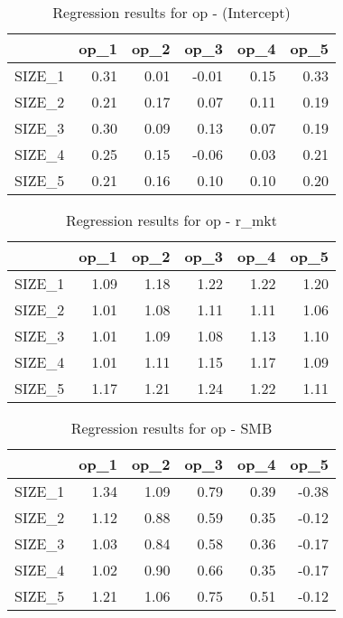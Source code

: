 \begin{table}[ht]
\centering
\caption{Regression results for op - (Intercept)} 
\begin{tabular}{rrrrrr}
  \hline
 & op\_1 & op\_2 & op\_3 & op\_4 & op\_5 \\ 
  \hline
SIZE\_1 & 0.31 & 0.01 & -0.01 & 0.15 & 0.33 \\ 
  SIZE\_2 & 0.21 & 0.17 & 0.07 & 0.11 & 0.19 \\ 
  SIZE\_3 & 0.30 & 0.09 & 0.13 & 0.07 & 0.19 \\ 
  SIZE\_4 & 0.25 & 0.15 & -0.06 & 0.03 & 0.21 \\ 
  SIZE\_5 & 0.21 & 0.16 & 0.10 & 0.10 & 0.20 \\ 
   \hline
\end{tabular}
\end{table}


\begin{table}[ht]
\centering
\caption{Regression results for op - r_mkt} 
\begin{tabular}{rrrrrr}
  \hline
 & op\_1 & op\_2 & op\_3 & op\_4 & op\_5 \\ 
  \hline
SIZE\_1 & 1.09 & 1.18 & 1.22 & 1.22 & 1.20 \\ 
  SIZE\_2 & 1.01 & 1.08 & 1.11 & 1.11 & 1.06 \\ 
  SIZE\_3 & 1.01 & 1.09 & 1.08 & 1.13 & 1.10 \\ 
  SIZE\_4 & 1.01 & 1.11 & 1.15 & 1.17 & 1.09 \\ 
  SIZE\_5 & 1.17 & 1.21 & 1.24 & 1.22 & 1.11 \\ 
   \hline
\end{tabular}
\end{table}


\begin{table}[ht]
\centering
\caption{Regression results for op - SMB} 
\begin{tabular}{rrrrrr}
  \hline
 & op\_1 & op\_2 & op\_3 & op\_4 & op\_5 \\ 
  \hline
SIZE\_1 & 1.34 & 1.09 & 0.79 & 0.39 & -0.38 \\ 
  SIZE\_2 & 1.12 & 0.88 & 0.59 & 0.35 & -0.12 \\ 
  SIZE\_3 & 1.03 & 0.84 & 0.58 & 0.36 & -0.17 \\ 
  SIZE\_4 & 1.02 & 0.90 & 0.66 & 0.35 & -0.17 \\ 
  SIZE\_5 & 1.21 & 1.06 & 0.75 & 0.51 & -0.12 \\ 
   \hline
\end{tabular}
\end{table}


